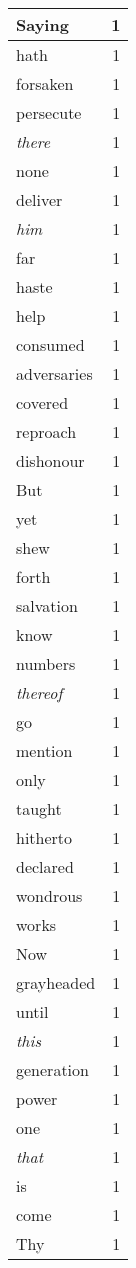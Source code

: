 \begin{center}
\begin{longtable}{l|r}
Saying & 1 \\ \hline
hath & 1 \\ \hline
forsaken & 1 \\ \hline
persecute & 1 \\ \hline
\emph{there} & 1 \\ \hline
none & 1 \\ \hline
deliver & 1 \\ \hline
\emph{him} & 1 \\ \hline
far & 1 \\ \hline
haste & 1 \\ \hline
help & 1 \\ \hline
consumed & 1 \\ \hline
adversaries & 1 \\ \hline
covered & 1 \\ \hline
reproach & 1 \\ \hline
dishonour & 1 \\ \hline
But & 1 \\ \hline
yet & 1 \\ \hline
shew & 1 \\ \hline
forth & 1 \\ \hline
salvation & 1 \\ \hline
know & 1 \\ \hline
numbers & 1 \\ \hline
\emph{thereof} & 1 \\ \hline
go & 1 \\ \hline
mention & 1 \\ \hline
only & 1 \\ \hline
taught & 1 \\ \hline
hitherto & 1 \\ \hline
declared & 1 \\ \hline
wondrous & 1 \\ \hline
works & 1 \\ \hline
Now & 1 \\ \hline
grayheaded & 1 \\ \hline
until & 1 \\ \hline
\emph{this} & 1 \\ \hline
generation & 1 \\ \hline
power & 1 \\ \hline
one & 1 \\ \hline
\emph{that} & 1 \\ \hline
is & 1 \\ \hline
come & 1 \\ \hline
Thy & 1 \\ \hline

\end{longtable}
\end{center}

